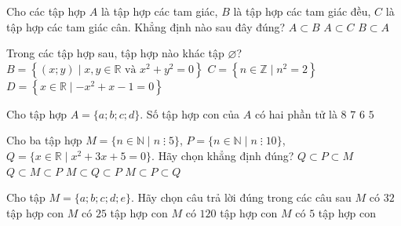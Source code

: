\begin{ex}%
	Cho  các tập hợp $A$ là tập hợp các tam giác, $B$ là tập hợp các tam giác đều, $C$ là tập hợp các tam giác cân. Khẳng định nào sau đây đúng?
		{$A \subset B$} 
		 {$A \subset C$}
		{\True $B \subset  A$}
\end{ex}

\begin{ex}%
	Trong các tập hợp sau,  tập hợp nào khác tập $\varnothing$?
		{ \True $ B = \left\{(x;y) \mid x,y \in \mathbb{R} \text{  và } x^2+y^2= 0\right\}$}
		{$C=  \left\{n \in \mathbb{Z} \mid n^2 = 2 \right\} $}
		{$ D = \left\{x \in \mathbb{R}  \mid -x^2+x-1= 0\right\}$}
\end{ex}

\begin{ex}%
	Cho tập hợp $A=\{a;b;c;d\}$. Số tập hợp con của $A$  có hai phần tử là
	 \choice
		 {$8$}
		 {$7$}
		 {\True $6$}
		 {$5$}
\end{ex}

\begin{ex}%
	Cho ba tập hợp $M=\{n \in \mathbb{N} \mid n \; \vdots \; 5\}$, $P=\{n  \in \mathbb{N} \mid n \; \vdots \; 10\}$, $Q=\{x \in \mathbb{R} \mid x^2+3x+5=0\}$. Hãy chọn khẳng định đúng?
	\choice 
		{\True $Q  \subset P \subset M$}
		{$Q \subset M \subset P$} 
		{$M  \subset Q \subset P$}
		{$M  \subset P \subset Q$}
\end{ex}

\begin{ex}%
	Cho tập $M=\{a;b;c;d;e\}$. Hãy chọn câu trả lời đúng  trong các câu sau
	\choice 
		{\True $M$ có  $32$ tập hợp con}
		{$M$ có $25$  tập hợp con}
		{$M$ có  $120$ tập hợp con}
		{$M$ có $5$  tập hợp con}
\end{ex}

